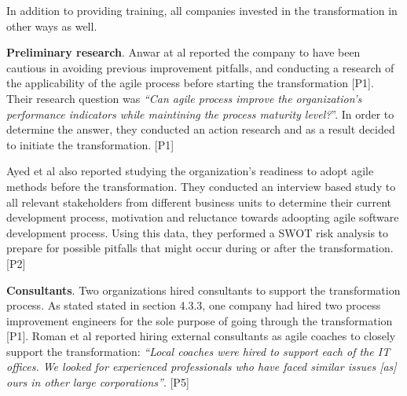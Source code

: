 In addition to providing training, all companies invested in the
transformation in other ways as well.

{\bfseries Preliminary research}. Anwar at al reported the company
to have been cautious in avoiding previous improvement pitfalls,
and conducting a research of the applicability of the agile process
before starting the transformation [P1]. Their research question was
\textit{``Can agile process improve the organization's performance
indicators while maintining the process maturity level?}''. In order to
determine the answer, they conducted an action research and as a result
decided to initiate the transformation. [P1]

Ayed et al also reported studying the organization's readiness to adopt
agile methods before the transformation. They conducted an interview
based study to all relevant stakeholders from different business
units to determine their current development process, motivation and
reluctance towards adoopting agile software development process. Using
this data, they performed a SWOT risk analysis to prepare for possible
pitfalls that might occur during or after the transformation. [P2]

{\bfseries Consultants}. Two organizations hired consultants to support
the transformation process. As stated stated in section 4.3.3, one
company had hired two process improvement engineers for the sole
purpose of going through the transformation [P1]. Roman et al reported
hiring external consultants as agile coaches to closely support the
transformation: \textit{``Local coaches were hired to support each of
the IT offices. We looked for experienced professionals who have faced
similar issues [as] ours in other large corporations''}. [P5]
